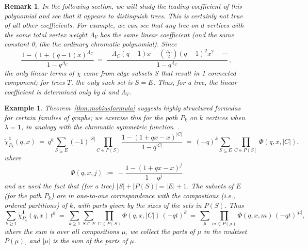 \documentclass[11pt]{amsart}
\newtheorem{exam}{Example}
\newenvironment{example}{\begin{exam}\sf}{\end{exam}}
\newtheorem{rem}{Remark}
\newenvironment{remark}{\begin{rem}\sf}{\end{rem}}
\newcommand\bone{\mathbf{1}}
\begin{document}
\begin{remark}\label{rmk:linear-coeff}
In the following section, we will study the leading coefficient of this polynomial and see that it appears to distinguish trees. 
This is certainly not true of all other coefficients. 
For example, we can see that any tree on $d$ vertices with the same total vertex weight $\Lambda_V$ has the same linear coefficient (and the same constant 0, like the ordinary chromatic polynomial). 
Since 
\[
\frac{1-(1+(q-1)x)^{\Lambda_C}}{1-q^{\Lambda_C}} \ = \
\frac{-\Lambda_C(q-1)x-\binom{\Lambda_C}{2}(q-1)^2x^2-\cdots}{1-q^{\Lambda_C}} \, ,
\] 
the only linear terms of $\widetilde{\chi}$ come from edge subsets $S$ that result in 1 connected component; for trees $T$, the only such set is $S=E$. 
Thus, for a tree, the linear coefficient is determined only by $d$ and $\Lambda_V$.
\end{remark}

\begin{example}\label{ex:paths}
Theorem~\ref{thm:mobiusformula} suggests highly structured formulas for certain families of
graphs; we exercise this for the path $P_k$ on $k$ vertices when $\lambda = \bone$, in analogy with the chromatic symmetric function~\cite[Exercise~7.47(k)]{EC2}.
\[
\widetilde\chi^\bone_{ P_k }(q,x)
  \ = \ q^k \sum_{S\subseteq E}(-1)^{|S|} \prod_{C \in P(S)} \frac{1-(1+qx-x)^{|C|}}{1-q^{|C|}}
  \ =  \ (-q)^k \sum_{S\subseteq E} \prod_{C \in P(S)} \Phi(q,x, |C|),
\] 
where
\[
  \Phi(q,x,j) \ := \ - \frac{1-(1+qx-x)^{j}}{1-q^{j}} 
\]
and we used the fact that (for a tree) $|S| + |P(S)| = |E| + 1$.
The subsets of $E$ (for the path $P_k$) are in one-to-one correspondence with the compostions
(i.e., ordered partitions) of $k$, with parts given by the sizes of the sets in $P(S)$. Thus
\[
  \sum_{ k \ge 1 } \widetilde\chi^\bone_{ P_k }(q,x) \, t^k
  \ = \ \sum_{ k \ge 1 } \sum_{S\subseteq E} \prod_{C \in P(S)} \Phi(q,x, |C|) \, (-qt)^k
  \ = \ \sum_{ \mu } \prod_{m \in P(\mu)} \Phi(q,x, m) \, (-qt)^{ |\mu| }, 
\]
where the sum is over all compositions $\mu$, we collect the parts of $\mu$ in the multiset
$P(\mu)$, and $|\mu|$ is the sum of the parts of $\mu$.
\end{example}
\end{document}
